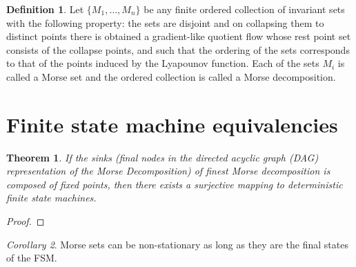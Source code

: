 \documentclass{scrartcl}
\newtheorem{theorem}{Theorem}
\theoremstyle{definition}
\newtheorem{definition}{Definition}
\theoremstyle{remark}
\newtheorem{corollary}[theorem]{Corollary}
\begin{document}
\begin{definition}
Let $\{M_1, \dots, M_n\}$ be any finite ordered collection of invariant sets with the following property: the sets are disjoint and on collapsing them to distinct points there is obtained a gradient-like quotient flow whose rest point set consists of the collapse points, and such that the ordering of the sets corresponds to that of the points induced by the Lyapounov function.
 Each of the sets $M_i$ is called a Morse set and the ordered collection is called a Morse decomposition.
\end{definition}


\section{Finite state machine equivalencies}\label{sec:fsm}
\begin{theorem}
If the sinks (final nodes in the directed acyclic graph (DAG) representation of the Morse Decomposition) of finest Morse decomposition is composed of fixed points, then there exists a surjective mapping to deterministic finite state machines.
\end{theorem}

\begin{proof}

\end{proof}

\begin{corollary}
Morse sets can be non-stationary as long as they are the final states of the FSM.
\end{corollary}




 \newpage
 
 
\end{document}
